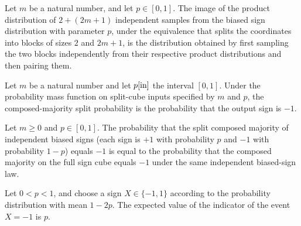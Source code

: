 \begin{theorem}
\label{FABL.productProbabilityPMF_map_composedMajoritySplitEquiv}
\leanok
{}
Let $m$ be a natural number, and let $p\in[0,1]$. The image of the product distribution
of $2+(2m+1)$ independent samples from the biased sign distribution with parameter $p$,
under the equivalence that splits the coordinates into blocks of sizes $2$ and $2m+1$,
is the distribution obtained by first sampling the two blocks independently from their
respective product distributions and then pairing them.
\end{theorem}

\begin{definition}
\label{FABL.composedMajoritySplitProbability}
\leanok
{}
Let $m$ be a natural number and let $p\ref{in}$ the interval $[0,1]$. Under the
probability mass function on split-cube inputs specified by $m$ and $p$, the
composed-majority split probability is the probability that the output sign is $-1$.
\end{definition}

\begin{theorem}
\label{FABL.composedMajoritySplitProbability_eq_biasedMinusProbability}
\leanok
{}
Let $m\ge 0$ and $p\in[0,1]$. The probability that the split composed majority of
independent biased signs (each sign is $+1$ with probability $p$ and $-1$ with
probability $1-p$) equals $-1$ is equal to the probability that the composed majority on
the full sign cube equals $-1$ under the same independent biased-sign law.
\end{theorem}

\begin{theorem}
\label{FABL.pmfExpectation_biasedSignPMF_negIndicator}
\leanok
{}
Let $0<p<1$, and choose a sign $X\in\{-1,1\}$ according to the probability distribution
with mean $1-2p$. The expected value of the indicator of the event $X=-1$ is $p$.
\end{theorem}

